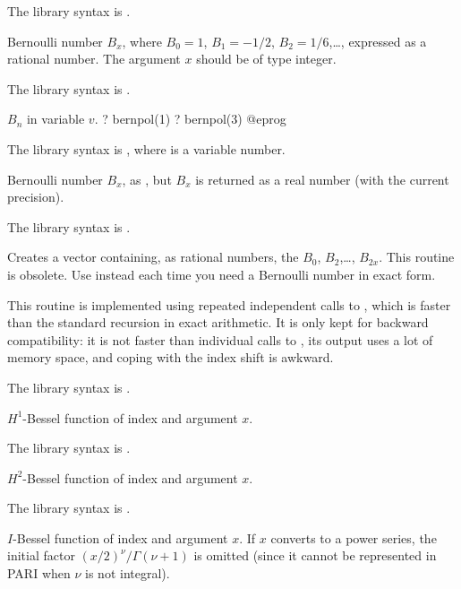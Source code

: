 The library syntax is .

\label{se:bernfrac}
Bernoulli number $B_x$,
where $B_0=1$, $B_1=-1/2$, $B_2=1/6$,\dots, expressed as a rational number.
The argument $x$ should be of type integer.

The library syntax is .

\label{se:bernpol}
 $B_n$ in variable $v$.
\bprog
? bernpol(1)
? bernpol(3)
@eprog

The library syntax is , where  is a variable number.

\label{se:bernreal}
Bernoulli number
$B_x$, as , but $B_x$ is returned as a real number
(with the current precision).

The library syntax is .

\label{se:bernvec}
Creates a vector containing, as rational numbers,
the  $B_0$, $B_2$,\dots, $B_{2x}$.
This routine is obsolete. Use  instead each time you need a
Bernoulli number in exact form.

 This routine is implemented using repeated independent
calls to , which is faster than the standard recursion in exact
arithmetic. It is only kept for backward compatibility: it is not faster than
individual calls to , its output uses a lot of memory space,
and coping with the index shift is awkward.

The library syntax is .

\label{se:besselh1}
$H^1$-Bessel function of index  and argument $x$.

The library syntax is .

\label{se:besselh2}
$H^2$-Bessel function of index  and argument $x$.

The library syntax is .

\label{se:besseli}
$I$-Bessel function of index  and
argument $x$. If $x$ converts to a power series, the initial factor
$(x/2)^\nu/\Gamma(\nu+1)$ is omitted (since it cannot be represented in PARI
when $\nu$ is not integral).

